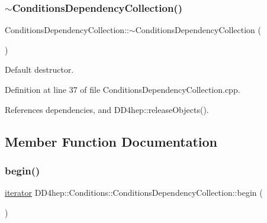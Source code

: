 \subsubsection{\texorpdfstring{$\sim$\+Conditions\+Dependency\+Collection()}{~ConditionsDependencyCollection()}}
{\footnotesize\ttfamily Conditions\+Dependency\+Collection\+::$\sim$\+Conditions\+Dependency\+Collection (\begin{DoxyParamCaption}{ }\end{DoxyParamCaption})\hspace{0.3cm}{\ttfamily [virtual]}}



Default destructor. 



Definition at line 37 of file Conditions\+Dependency\+Collection.\+cpp.



References dependencies, and D\+D4hep\+::release\+Objects().



\subsection{Member Function Documentation}
\hypertarget{class_d_d4hep_1_1_conditions_1_1_conditions_dependency_collection_a975ac1f54aa844d4ae3c3e15f70bfdaa}{}\label{class_d_d4hep_1_1_conditions_1_1_conditions_dependency_collection_a975ac1f54aa844d4ae3c3e15f70bfdaa} 
\subsubsection{\texorpdfstring{begin()}{begin()}\hspace{0.1cm}{\footnotesize\ttfamily [1/2]}}
{\footnotesize\ttfamily \hyperlink{class_d_d4hep_1_1_conditions_1_1_conditions_dependency_collection_a685a1a6841f2fa4d70ab9a9bfb7b0b6a}{iterator} D\+D4hep\+::\+Conditions\+::\+Conditions\+Dependency\+Collection\+::begin (\begin{DoxyParamCaption}{ }\end{DoxyParamCaption})\hspace{0.3cm}{\ttfamily [inline]}}



